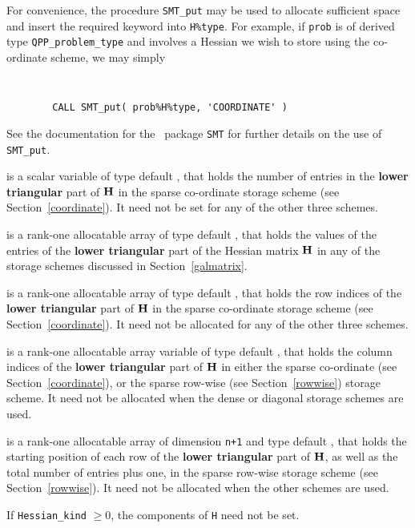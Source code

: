 \documentclass{galahad}
\newcommand{\packagename}{QPP}
\begin{document}
\begin{description}
\begin{description}
For convenience, the procedure {\tt SMT\_put} 
may be used to allocate sufficient space and insert the required keyword
into {\tt H\%type}.
For example, if {\tt prob} is of derived type {\tt \packagename\_problem\_type}
and involves a Hessian we wish to store using the co-ordinate scheme,
we may simply
{\tt 
\begin{verbatim}
        CALL SMT_put( prob%H%type, 'COORDINATE' )
\end{verbatim}
}
\noindent
See the documentation for the \galahad\ package {\tt SMT} 
for further details on the use of {\tt SMT\_put}.

 is a scalar variable of type default \integer, that 
holds the number of entries in the {\bf lower triangular} part of ${\mathbf{H}}$
in the sparse co-ordinate storage scheme (see Section~\ref{coordinate}). 
It need not be set for any of the other three schemes.

 is a rank-one allocatable array of type default \realdp, that holds
the values of the entries of the {\bf lower triangular} part
of the Hessian matrix ${\mathbf{H}}$ in any of the 
storage schemes discussed in Section~\ref{galmatrix}.

 is a rank-one allocatable array of type default \integer,
that holds the row indices of the {\bf lower triangular} part of ${\mathbf{H}}$ 
in the sparse co-ordinate storage
scheme (see Section~\ref{coordinate}). 
It need not be allocated for any of the other three schemes.

 is a rank-one allocatable array variable of type default \integer,
that holds the column indices of the {\bf lower triangular} part of 
${\mathbf{H}}$ in either the sparse co-ordinate 
(see Section~\ref{coordinate}), or the sparse row-wise 
(see Section~\ref{rowwise}) storage scheme.
It need not be allocated when the dense or diagonal storage schemes are used.

 is a rank-one allocatable array of dimension {\tt n+1} and type 
default \integer, that holds the starting position of 
each row of the {\bf lower triangular} part of ${\mathbf{H}}$, as well
as the total number of entries plus one, in the sparse row-wise storage
scheme (see Section~\ref{rowwise}). It need not be allocated when the
other schemes are used.

\end{description}
If {\tt Hessian\_kind} $\geq 0$, the components of {\tt H} need not be set.


\end{description}
\end{document}
